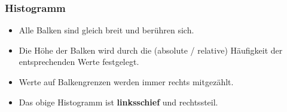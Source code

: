 \begin{multicols}{2}
\subsubsection*{Histogramm}

\begin{itemize}
\item Alle Balken sind gleich breit und berühren sich.
\item Die Höhe der Balken wird durch die (absolute / relative) Häufigkeit der entsprechenden
Werte festgelegt.
\item Werte auf Balkengrenzen werden immer rechts mitgezählt.
\item Das obige Histogramm ist \textbf{linksschief} und rechtssteil.
\end{itemize}



\end{multicols}


\newpage
